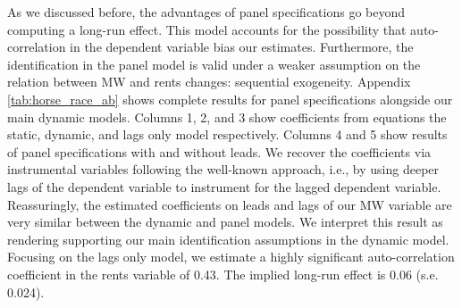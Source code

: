 As we discussed before, the advantages of panel specifications go beyond computing a long-run effect.
This model accounts for the possibility that auto-correlation in the dependent variable bias our 
estimates. Furthermore, the identification in the panel model is valid under a weaker assumption on 
the relation between MW and rents changes: sequential exogeneity. Appendix \autoref{tab:horse_race_ab} shows complete results for panel specifications alongside our main dynamic models. Columns 1, 
2, and 3 show coefficients from equations the static, dynamic, and lags only model respectively. Columns 
4 and 5 show results of panel specifications with and without leads. We recover the coefficients via 
instrumental variables following the well-known \textcite{ArellanoBond1991} approach, i.e., by using 
deeper lags of the dependent variable to instrument for the lagged dependent variable. Reassuringly, 
the estimated coefficients on leads and lags of our MW variable are very similar between the dynamic
and panel models. We interpret this result as rendering supporting our main identification assumptions
in the dynamic model. Focusing on the lags only model, we estimate a highly significant auto-correlation 
coefficient in the rents variable of 0.43. The implied long-run effect is 0.06 (s.e. 0.024).

